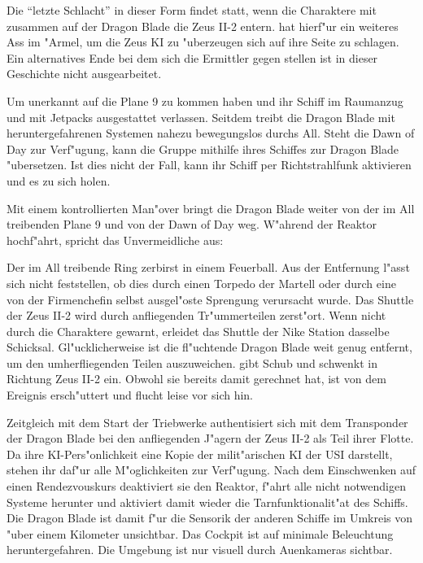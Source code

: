 
Die "`letzte Schlacht"' in dieser Form findet statt, wenn die Charaktere mit \xl{} zusammen auf der Dragon Blade die Zeus II-2 entern. \xl{} hat hierf"ur ein weiteres Ass im "Armel, um die Zeus KI zu "uberzeugen sich auf ihre Seite zu schlagen. Ein alternatives Ende bei dem sich die Ermittler gegen \xl{} stellen ist in dieser Geschichte nicht ausgearbeitet.

Um unerkannt auf die Plane 9 zu kommen haben \xl{} und \ml{} ihr Schiff im Raumanzug und mit Jetpacks ausgestattet verlassen. Seitdem treibt die Dragon Blade mit heruntergefahrenen Systemen nahezu bewegungslos durchs All. Steht die Dawn of Day zur Verf"ugung, kann die Gruppe mithilfe ihres Schiffes zur Dragon Blade "ubersetzen. Ist dies nicht der Fall, kann \xl{} ihr Schiff per Richtstrahlfunk aktivieren und es zu sich holen.

Mit einem kontrollierten Man"over bringt \xl{} die Dragon Blade weiter von der im All treibenden Plane 9 und von der Dawn of Day weg. W"ahrend der Reaktor hochf"ahrt, spricht \xl{} das Unvermeidliche aus:


Der im All treibende Ring zerbirst in einem Feuerball. Aus der Entfernung l"asst sich nicht feststellen, ob dies durch einen Torpedo der Martell oder durch eine von der Firmenchefin selbst ausgel"oste Sprengung verursacht wurde. Das Shuttle der Zeus II-2 wird durch anfliegenden Tr"ummerteilen zerst"ort. Wenn nicht durch die Charaktere gewarnt, erleidet das Shuttle der Nike Station dasselbe Schicksal. Gl"ucklicherweise ist die fl"uchtende Dragon Blade weit genug entfernt, um den umherfliegenden Teilen auszuweichen. \xl{} gibt Schub und schwenkt in Richtung Zeus II-2 ein. Obwohl sie bereits damit gerechnet hat, ist \ml{} von dem Ereignis ersch"uttert und flucht leise vor sich hin.

Zeitgleich mit dem Start der Triebwerke authentisiert sich \xl{} mit dem Transponder der Dragon Blade bei den anfliegenden J"agern der Zeus II-2 als Teil ihrer Flotte. Da ihre KI-Pers"onlichkeit eine Kopie der milit"arischen KI der USI darstellt, stehen ihr daf"ur alle M"oglichkeiten zur Verf"ugung. Nach dem Einschwenken auf einen Rendezvouskurs deaktiviert sie den Reaktor, f"ahrt alle nicht notwendigen Systeme herunter und aktiviert damit wieder die Tarnfunktionalit"at des Schiffs. Die Dragon Blade ist damit f"ur die Sensorik der anderen Schiffe im Umkreis von "uber einem Kilometer unsichtbar. Das Cockpit ist auf minimale Beleuchtung heruntergefahren. Die Umgebung ist nur visuell durch Au\3enkameras sichtbar.

